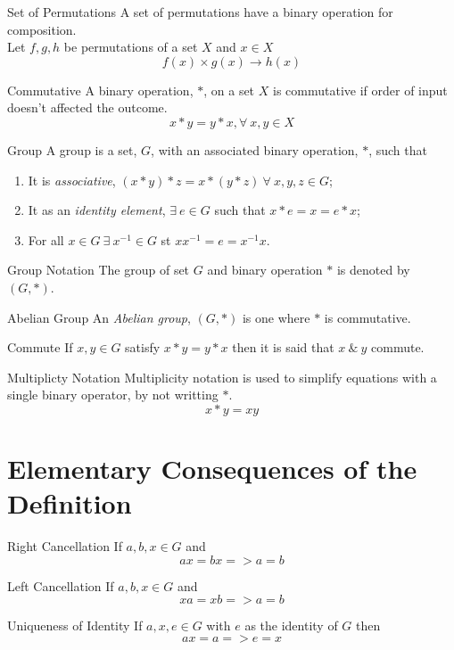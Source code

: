\documentclass[11pt,a4paper]{article}
\begin{document}
\subtitle{Remark 2.03 - }{Set of Permutations}
A set of permutations have a binary operation for composition.\\
Let $f, g, h$ be permutations of a set $X$ and $x \in X$ $$f(x) \times g(x) \to h(x)$$

\subtitle{Definition 2.04 - }{Commutative}
A binary operation, $*$, on a set $X$ is commutative if order of input doesn't affected the outcome. $$x * y = y * x,\forall\ x, y \in X$$

\subtitle{Defintion 2.05 - }{Group}
A group is a set, $G$, with an associated binary operation, $*$, such that
\begin{enumerate}[label=\roman*)]
  \item It is \textit{associative}, $(x * y) * z = x * (y * z)\ \forall\ x, y, z \in G$;
  \item It as an \textit{identity element}, $\exists\ e \in G$ such that $x * e = x = e * x$;
  \item For all $x \in G\ \exists\ x^{-1} \in G$ st $xx^{-1} = e = x^{-1}x$.\\
\end{enumerate}

\subtitle{Remark 2.06 - }{Group Notation}
The group of set $G$ and binary operation $*$ is denoted by $(G, *)$.\\

\subtitle{Definition 2.07 - }{Abelian Group}
An \textit{Abelian group}, $(G, *)$ is one where $*$ is commutative.\\

\subtitle{Definition 2.08 - }{Commute}
If $x, y \in G$ satisfy $x*y = y*x$ then it is said that $x\ \&\ y$ commute.\\

\subtitle{Remark 2.08 - }{Multiplicty Notation}
Multiplicity notation is used to simplify equations with a single binary operator, by not writting $*$. $$x * y = xy$$

\section{Elementary Consequences of the Definition}

\subtitle{Proposition 3.1 - }{Right Cancellation}
If $a, b, x \in G$ and $$ax = bx => a = b$$

\subtitle{Proposition 3.2 - }{Left Cancellation}
If $a, b, x \in G$ and $$xa = xb => a = b$$

\subtitle{Proposition 3.3 - }{Uniqueness of Identity}
If $a, x, e \in G$ with $e$ as the identity of $G$ then $$ax = a => e = x$$
\end{document}
